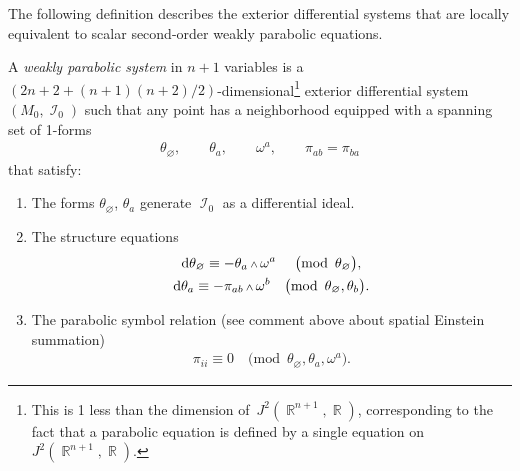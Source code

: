 \documentclass[pdftex]{sigma}
\DeclareMathOperator{\R}{\mathbb{R}}
\DeclareMathOperator{\I}{\mathcal{I}}
\renewcommand{\d}{{\rm d}}
\renewcommand{\mod}[1]{\quad\big(\mathrm{mod\enspace} #1\big)}
\newcommand{\w}{{\mathchoice{\,{\scriptstyle\wedge}\,}{{\scriptstyle\wedge}}
 {{\scriptscriptstyle\wedge}}{{\scriptscriptstyle\wedge}}}}
\newcommand{\thetas}[1]{\theta_{#1}}
\newcommand{\pis}[1]{\pi_{#1}}
\numberwithin{equation}{section}
\begin{document}
The following definition describes the exterior differential systems that are locally equivalent to scalar second-order weakly parabolic equations.
\begin{Definition}\label{def:weakly parabolic system}
 A \emph{weakly parabolic system} in $n+1$ variables is a
 $(2n+2+(n+1)(n+2)/2)$-dimensional\footnote{This is 1 less than the dimension of~$J^2(\R^{n+1},\R)$, corresponding to the fact that a parabolic equation is defined by a single equation on $J^2(\R^{n+1},\R)$.} exterior differential system $(M_0,\I_0)$ such that any point has a neighborhood equipped with a spanning set of 1-forms
 \begin{gather*}%
 \thetas{\varnothing},\qquad \thetas{a},\qquad\omega^a,\qquad\pis{ab} = \pis{ba}
 \end{gather*}
 that satisfy:
 \begin{enumerate}\itemsep=0pt
 \item
 The forms $\thetas{\varnothing}$, $\thetas{a}$ generate $\I_0$ as a differential ideal.
 \item
 The structure equations
 \begin{gather*}
 \d\thetas{\varnothing} \equiv -\thetas{a}\w\omega^a \ \mod{\thetas{\varnothing}},
 \\
 \d\thetas{a} \equiv -\pis{ab}\w\omega^b \mod{\thetas{\varnothing},\thetas{b}} .
 \end{gather*}
 \item
 The parabolic symbol relation (see comment above about spatial Einstein summation)
 \begin{gather*}
 \pis{ii} \equiv 0 \mod{\thetas{\varnothing},\thetas{a},\omega^a} .
 \end{gather*}
 \end{enumerate}
\end{Definition}
\end{document}
